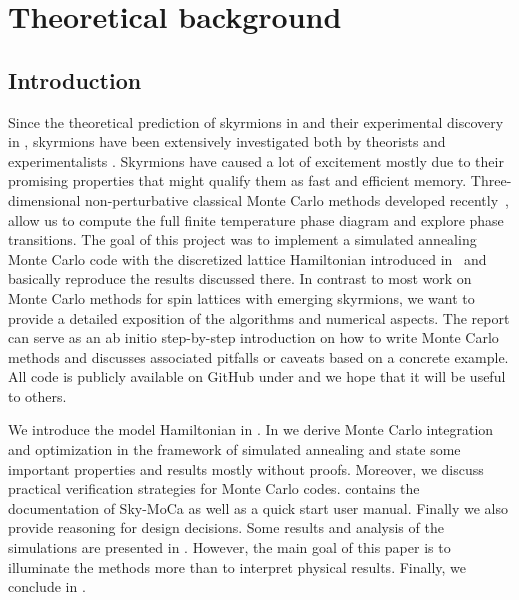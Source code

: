 %
\chapter{Theoretical background}\label{chap:1}
%
\section{Introduction}\label{sec:intro}
%
Since the theoretical prediction of skyrmions in 
 and their experimental discovery in  ,
skyrmions have been extensively investigated both by theorists and
experimentalists . Skyrmions have caused a lot of excitement
mostly due to their promising properties that might qualify them as fast and
efficient memory. Three-dimensional non-perturbative classical Monte Carlo
methods developed recently~\cite{skyrmionlattice}, allow us to compute the full
finite temperature phase diagram and explore phase transitions. The goal of this
project was to implement a simulated annealing Monte Carlo code with the
discretized lattice Hamiltonian introduced in~\cite{skyrmionlattice} and
basically reproduce the results discussed there.  In contrast to most work on
Monte Carlo methods for spin lattices with emerging skyrmions, we want to
provide a detailed exposition of the algorithms and numerical aspects. The
report can serve as an ab initio step-by-step introduction on how to write Monte
Carlo methods and discusses associated pitfalls or caveats based on a concrete
example.  All code is publicly available on GitHub under  and we hope
that it will be useful to others.

We introduce the model Hamiltonian in . In
 we derive Monte Carlo integration and optimization in the
framework of simulated annealing and state some important properties and results
mostly without proofs. Moreover, we discuss practical verification strategies
for Monte Carlo codes.  contains the documentation of Sky-MoCa
as well as a quick start user manual. Finally we also provide reasoning for
design decisions. Some results and analysis of the simulations are presented in
. However, the main goal of this paper is to illuminate the
methods more than to interpret physical results. Finally, we conclude in
.
%

